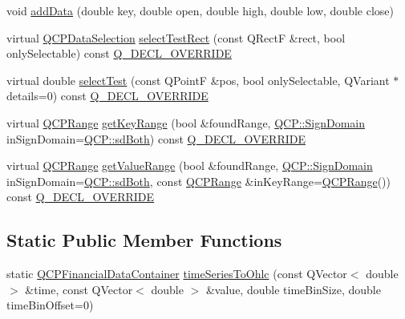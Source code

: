 \begin{DoxyCompactItemize}
\item 
void \hyperlink{class_q_c_p_financial_a688bbd052e00a02954ddb0068b378170}{add\+Data} (double key, double open, double high, double low, double close)
\item 
virtual \hyperlink{class_q_c_p_data_selection}{Q\+C\+P\+Data\+Selection} \hyperlink{class_q_c_p_financial_a3c5beb1ab028a1dba845fc9dcffc7cf4}{select\+Test\+Rect} (const Q\+RectF \&rect, bool only\+Selectable) const \hyperlink{qcustomplot_8h_a42cc5eaeb25b85f8b52d2a4b94c56f55}{Q\+\_\+\+D\+E\+C\+L\+\_\+\+O\+V\+E\+R\+R\+I\+DE}
\item 
virtual double \hyperlink{class_q_c_p_financial_aac8e91622ac58330fa9ce81cc8fd40ee}{select\+Test} (const Q\+PointF \&pos, bool only\+Selectable, Q\+Variant $\ast$details=0) const \hyperlink{qcustomplot_8h_a42cc5eaeb25b85f8b52d2a4b94c56f55}{Q\+\_\+\+D\+E\+C\+L\+\_\+\+O\+V\+E\+R\+R\+I\+DE}
\item 
virtual \hyperlink{class_q_c_p_range}{Q\+C\+P\+Range} \hyperlink{class_q_c_p_financial_a15d68fb257113fef697356d65fa76559}{get\+Key\+Range} (bool \&found\+Range, \hyperlink{namespace_q_c_p_afd50e7cf431af385614987d8553ff8a9}{Q\+C\+P\+::\+Sign\+Domain} in\+Sign\+Domain=\hyperlink{namespace_q_c_p_afd50e7cf431af385614987d8553ff8a9aa38352ef02d51ddfa4399d9551566e24}{Q\+C\+P\+::sd\+Both}) const \hyperlink{qcustomplot_8h_a42cc5eaeb25b85f8b52d2a4b94c56f55}{Q\+\_\+\+D\+E\+C\+L\+\_\+\+O\+V\+E\+R\+R\+I\+DE}
\item 
virtual \hyperlink{class_q_c_p_range}{Q\+C\+P\+Range} \hyperlink{class_q_c_p_financial_a82d862aa134d78853f98f8c57a03415b}{get\+Value\+Range} (bool \&found\+Range, \hyperlink{namespace_q_c_p_afd50e7cf431af385614987d8553ff8a9}{Q\+C\+P\+::\+Sign\+Domain} in\+Sign\+Domain=\hyperlink{namespace_q_c_p_afd50e7cf431af385614987d8553ff8a9aa38352ef02d51ddfa4399d9551566e24}{Q\+C\+P\+::sd\+Both}, const \hyperlink{class_q_c_p_range}{Q\+C\+P\+Range} \&in\+Key\+Range=\hyperlink{class_q_c_p_range}{Q\+C\+P\+Range}()) const \hyperlink{qcustomplot_8h_a42cc5eaeb25b85f8b52d2a4b94c56f55}{Q\+\_\+\+D\+E\+C\+L\+\_\+\+O\+V\+E\+R\+R\+I\+DE}
\end{DoxyCompactItemize}
\subsection*{Static Public Member Functions}
\begin{DoxyCompactItemize}
\item 
static \hyperlink{qcustomplot_8h_ae36e482e04f19a54782f01ab38c354a6}{Q\+C\+P\+Financial\+Data\+Container} \hyperlink{class_q_c_p_financial_a9a058c035040d3939b8884f4aaccb1a7}{time\+Series\+To\+Ohlc} (const Q\+Vector$<$ double $>$ \&time, const Q\+Vector$<$ double $>$ \&value, double time\+Bin\+Size, double time\+Bin\+Offset=0)
\end{DoxyCompactItemize}

